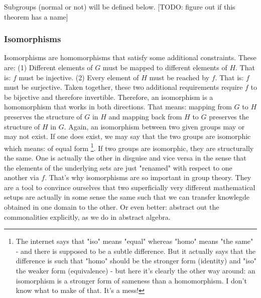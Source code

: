 \medskip Subgroups (normal or not) will be defined below.
[TODO: figure out if this theorem has a name]



\subsubsection{Isomorphisms}
Isomorphisms are homomorphisms that satisfy some additional constraints. These are: (1) Different elements of $G$ must be mapped to different elements of $H$. That is: $f$ must be injective. (2) Every element of $H$ must be reached by $f$. That is: $f$ must be surjective. Taken together, these two additional requirements require $f$ to be bijective and therefore invertible. Therefore, an isomorphism is a homomorphism that works in both directions. That means: mapping from $G$ to $H$ preserves the structure of $G$ in $H$ and mapping back from $H$ to $G$ preserves the structure of $H$ in $G$. Again, an isomorphism between two given groups may or may not exist. If one does exist, we may say that the two groups are isomorphic which means: of equal form \footnote{The internet says that "iso" means "equal" whereas "homo" means "the same" - and there is supposed to be a subtle difference. But it actually says that the difference is such that "homo" should be the stronger form (identity) and "iso" the weaker form (equivalence) - but here it's clearly the other way around: an isomorphism is a stronger form of sameness than a homomorphism. I don't know what to make of that. It's a mess!}. If two groups are isomorphic, they are structurally the same. One is actually the other in disguise and vice versa in the sense that the elements of the underlying sets are just "renamed" with respect to one another via $f$. 
That's why isomorphisms are so important in group theory. They are a tool to convince ourselves that two superficially very different mathematical setups are actually in some sense the same such that we can transfer knowlegde obtained in one domain to the other. Or even better: abstract out the commonalities explicitly, as we do in abstract algebra.

